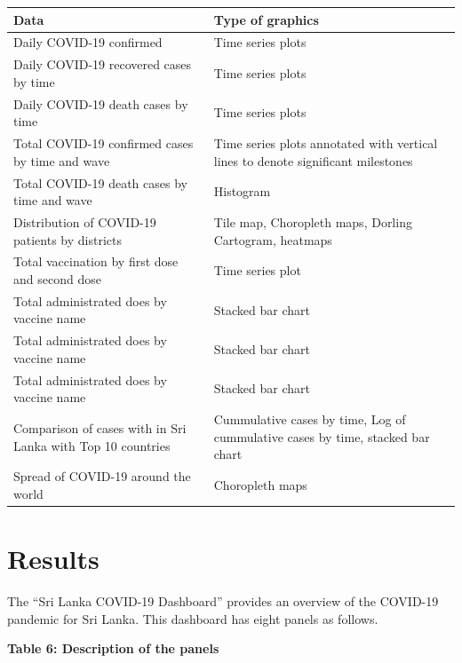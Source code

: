 \documentclass[
]{article}
\begin{document}
\begin{longtable}[]{@{}
  >{\raggedright\arraybackslash}p{}
  >{\raggedright\arraybackslash}p{}@{}}
\toprule
\textbf{Data} & \textbf{Type of graphics} \\
\midrule
\endhead
Daily COVID-19 confirmed & Time series plots \hfill\break \\
Daily COVID-19 recovered cases by time & Time series plots
\hfill\break \\
Daily COVID-19 death cases by time & Time series plots \hfill\break \\
Total COVID-19 confirmed cases by time and wave & Time series plots
annotated with vertical lines to denote significant milestones
\hfill\break \\
Total COVID-19 death cases by time and wave & Histogram \hfill\break \\
Distribution of COVID-19 patients by districts & Tile map, Choropleth
maps, Dorling Cartogram, heatmaps \hfill\break \\
Total vaccination by first dose and second dose & Time series plot
\hfill\break \\
Total administrated does by vaccine name & Stacked bar chart
\hfill\break \\
Total administrated does by vaccine name & Stacked bar chart
\hfill\break \\
Total administrated does by vaccine name & Stacked bar chart
\hfill\break \\
Comparison of cases with in Sri Lanka with Top 10 countries &
Cummulative cases by time, Log of cummulative cases by time, stacked bar
chart \hfill\break \\
Spread of COVID-19 around the world & Choropleth maps \hfill\break \\
\bottomrule
\end{longtable}

\newpage

\hypertarget{results}{%
\section{Results}\label{results}}

The ``Sri Lanka COVID-19 Dashboard'' provides an overview of the
COVID-19 pandemic for Sri Lanka. This dashboard has eight panels as
follows.

\textbf{Table 6: Description of the panels}
\end{document}

